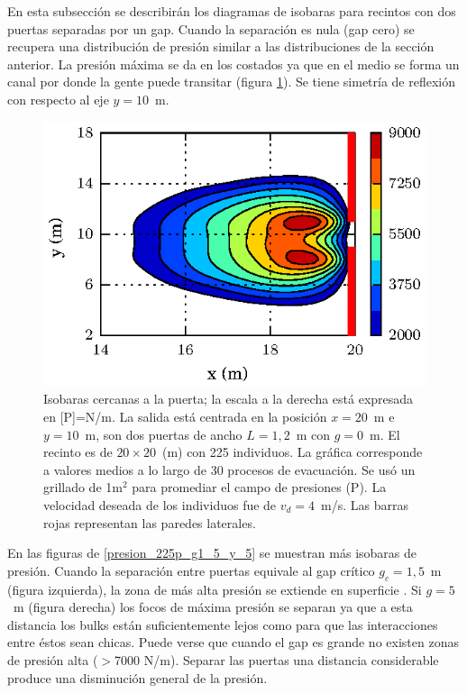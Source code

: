 En esta subsección se describirán los diagramas de isobaras para recintos con dos puertas separadas por un gap. 
Cuando la separación es nula (gap cero) se recupera una distribución de presión similar a las distribuciones de la sección anterior. La presión máxima se da en los costados ya que en el medio se forma un canal por donde la gente puede transitar (figura \ref{presion_225p_g0}). Se tiene simetría de reflexión con respecto al eje $y=10$~m. 
\begin{figure}[H]
    \centering
    \includegraphics[scale=1.6]{figuras/press_225p_v4_g0.eps}
    \caption[width=5cm]{Isobaras cercanas a la puerta; la escala a la derecha está expresada en [P]=N/m. La salida está centrada en la posición $x=20$~m e $y=10$~m, son dos puertas de ancho $L=1,2$~m con $g=0$~m. El recinto es de $20\times 20$~(m) con 225 individuos. La gráfica corresponde a valores medios a lo largo de 30 procesos de evacuación. Se usó un grillado de 1m$^2$ para promediar el campo de presiones (P). La velocidad deseada de los individuos fue de $v_d=4$~m/s. Las barras rojas representan las paredes laterales.}
    \label{presion_225p_g0}
\end{figure}

En las figuras de \ref{presion_225p_g1_5_y_5} se muestran más isobaras de presión. Cuando la separación entre puertas equivale al gap crítico $g_c=1,5$~m (figura izquierda), la zona de más alta presión se extiende en superficie . Si $g=5$~m (figura derecha) los focos de máxima presión se separan ya que a esta distancia los bulks están suficientemente lejos como para que las interacciones entre éstos sean chicas. Puede verse que cuando el gap es grande no existen zonas de presión alta ($>$7000 N/m). Separar las puertas una distancia considerable produce una disminución general de la presión. \\

